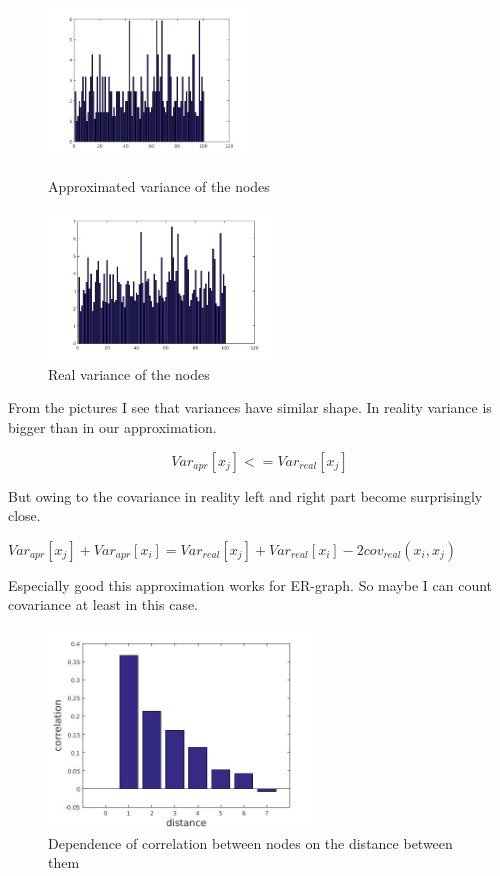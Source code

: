 \documentclass[12pt]{report}
\begin{document}
\begin{figure}
\centering
\begin{minipage}{0.45\textwidth}
\centering
\includegraphics[height=150px]{nodeVarApprox}
\caption{Approximated variance of the nodes}
\end{minipage}\hfill
\begin{minipage}{0.45\textwidth}
\centering
\includegraphics[height=150px]{nodeVarReal}
\caption{Real variance of the nodes}
\end{minipage}
\end{figure}

From the pictures I see that variances have similar shape. In reality variance is bigger than in our approximation.

$$Var_{apr}[x_j] <= Var_{real}[x_j]$$


But owing to the covariance in reality left and right part become surprisingly close.

$Var_{apr}[x_j] + Var_{apr}[x_i] = Var_{real}[x_j] + Var_{real}[x_i] - 2cov_{real}(x_i, x_j)$

Especially good this approximation works for ER-graph. So maybe I can count covariance at least in this case.

\begin{figure}[ht]
    \centering
    \includegraphics[height=200px]{correlationDistance}
    \caption{Dependence of correlation between nodes on the distance between them}
\end{figure}
\end{document}
